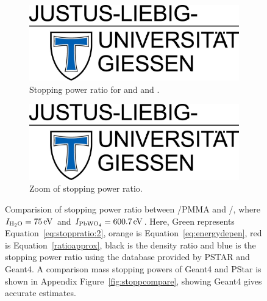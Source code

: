 \documentclass{article}
\begin{document}
\begin{figure}[h]
    \centering
    \begin{subfigure}[t]{0.43\textwidth}
        \centering
        \includegraphics[width=\textwidth]{fig/jlu.png}
        \caption{Stopping power ratio for  and and .}
        \label{fig:approx:pwo:1}
    \end{subfigure}
    \hfill
    \begin{subfigure}[t]{0.43\textwidth}
        \centering
        \includegraphics[width=\textwidth]{fig/jlu.png}
        \caption{Zoom of stopping power ratio.}
        \label{fig:approx:pwo:2}
    \end{subfigure}
    \caption{Comparision of stopping power ratio between /PMMA and /, where $I_{\ce{H2O}}=\SI{75}{\electronvolt}$ and $I_{\ce{PbWO4}}=\SI{600.7}{\electronvolt}$. Here, Green represents Equation~\ref{eq:stoppratio:2}, orange is Equation~\ref{eq:energydepen}, red is Equation~\ref{ratioapprox}, black is the density ratio and blue is the stopping power ratio using the database provided by PSTAR and Geant4. A comparison mass stopping powers of Geant4 and PStar is shown in Appendix Figure~\ref{fig:stoppcompare}, showing Geant4 gives accurate estimates.  }
    \label{fig:approx:pwo}
\end{figure}
\end{document}
